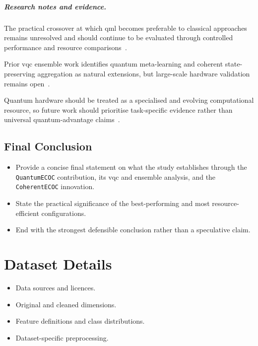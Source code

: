 \documentclass[]{UCD_CS_MSc_AAI_Report}
\newcommand{\limitation}[1]{{\color{orange}#1}}
\newcommand{\gap}[1]{{\color{black}#1}}
\newcommand{\researchnotes}{\paragraph{Research notes and evidence.}}
\begin{document}
\researchnotes
\begin{itemize}
    \gap{\item The practical crossover at which \ac{qml} becomes preferable to classical approaches remains unresolved and should continue to be evaluated through controlled performance and resource comparisons~\cite{biamonte_quantum_2017}.}
    \gap{\item Prior \ac{vqc} ensemble work identifies quantum meta-learning and coherent state-preserving aggregation as natural extensions, but large-scale hardware validation remains open~\cite{pinto_composing_2026,incudini_resource_2023}.}
    \limitation{\item Quantum hardware should be treated as a specialised and evolving computational resource, so future work should prioritise task-specific evidence rather than universal quantum-advantage claims~\cite{resch_quantum_2019}.}
\end{itemize}

\section{Final Conclusion}
\label{sec:conclusion-final}
\begin{itemize}
    \item Provide a concise final statement on what the study establishes through the \texttt{QuantumECOC} contribution, its \ac{vqc} and ensemble analysis, and the \texttt{CoherentECOC} innovation.
    \item State the practical significance of the best-performing and most resource-efficient configurations.
    \item End with the strongest defensible conclusion rather than a speculative claim.
\end{itemize}

\appendix

\chapter{Dataset Details}
\label{app:datasets}
\begin{itemize}
    \item Data sources and licences.
    \item Original and cleaned dimensions.
    \item Feature definitions and class distributions.
    \item Dataset-specific preprocessing.
\end{itemize}
\end{document}
